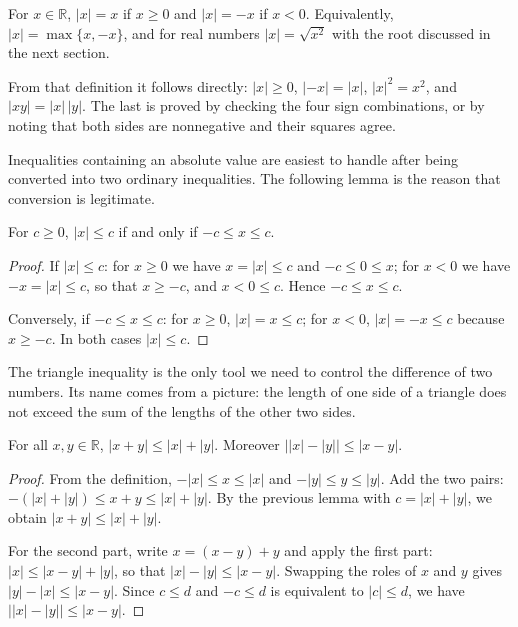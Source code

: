 \begin{definisi}
For $x\in\mathbb{R}$, $|x|=x$ if $x\ge 0$ and $|x|=-x$ if $x<0$. Equivalently,
$|x|=\max\{x,-x\}$, and for real numbers $|x|=\sqrt{x^2}$ with the root discussed in
the next section.
\end{definisi}

From that definition it follows directly: $|x|\ge 0$, $|{-x}|=|x|$, $|x|^2=x^2$, and
$|xy|=|x|\,|y|$. The last is proved by checking the four sign combinations, or by
noting that both sides are nonnegative and their squares agree.

Inequalities containing an absolute value are easiest to handle after being converted
into two ordinary inequalities. The following lemma is the reason that conversion is
legitimate.

\begin{lemma}
For $c\ge 0$, $|x|\le c$ if and only if $-c\le x\le c$.
\end{lemma}

\begin{proof}
If $|x|\le c$: for $x\ge 0$ we have $x=|x|\le c$ and $-c\le 0\le x$; for
$x<0$ we have $-x=|x|\le c$, so that $x\ge -c$, and $x<0\le c$. Hence
$-c\le x\le c$.

Conversely, if $-c\le x\le c$: for $x\ge 0$, $|x|=x\le c$; for $x<0$,
$|x|=-x\le c$ because $x\ge -c$. In both cases $|x|\le c$.
\end{proof}

The triangle inequality is the only tool we need to control the difference of two
numbers. Its name comes from a picture: the length of one side of a triangle does not
exceed the sum of the lengths of the other two sides.

\begin{teorema}
For all $x,y\in\mathbb{R}$, $|x+y|\le |x|+|y|$. Moreover
$\bigl||x|-|y|\bigr|\le |x-y|$.
\end{teorema}

\begin{proof}
From the definition, $-|x|\le x\le |x|$ and $-|y|\le y\le |y|$. Add the two pairs:
$-(|x|+|y|)\le x+y\le |x|+|y|$. By the previous lemma with $c=|x|+|y|$, we obtain
$|x+y|\le |x|+|y|$.

For the second part, write $x=(x-y)+y$ and apply the first part:
$|x|\le |x-y|+|y|$, so that $|x|-|y|\le |x-y|$. Swapping the roles of $x$ and $y$
gives $|y|-|x|\le |x-y|$. Since $c\le d$ and $-c\le d$ is equivalent to $|c|\le d$,
we have $\bigl||x|-|y|\bigr|\le |x-y|$.
\end{proof}

